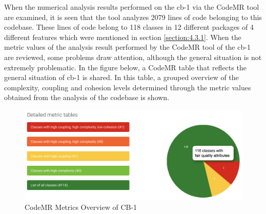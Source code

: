 When the numerical analysis results performed on the cb-1 via the CodeMR tool are examined, it is seen that the tool analyzes 2079 lines of code belonging to this codebase. These lines of code belong to 118 classes in 12 different packages of 4 different features which were mentioned in section \ref{section:4.3.1}. When the metric values of the analysis result performed by the CodeMR tool of the cb-1 are reviewed, some problems draw attention, although the general situation is not extremely problematic. In the figure below, a CodeMR table that reflects the general situation of cb-1 is shared. In this table, a grouped overview of the complexity, coupling and cohesion levels determined through the metric values obtained from the analysis of the codebase is shown.
\begin{figure}[ht!]
    \centering
    \includegraphics[scale=0.45]{figures/cb-1-metric-table.png}
    \caption{CodeMR Metrics Overview of CB-1}
    \label{fig:cb-1-metric-table.png}
\end{figure}
\FloatBarrier
